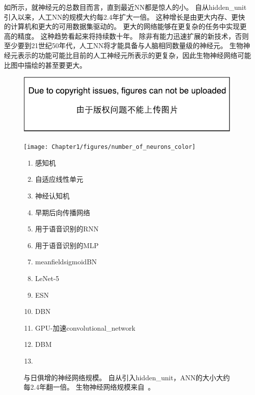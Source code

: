 如所示，就神经元的总数目而言，直到最近\gls{NN}都是惊人的小。
自从\gls{hidden_unit}引入以来，人工\gls{NN}的规模大约每2.4年扩大一倍。
这种增长是由更大内存、更快的计算机和更大的可用数据集驱动的。
更大的网络能够在更复杂的任务中实现更高的精度。
这种趋势看起来将持续数十年。
除非有能力迅速扩展的新技术，否则至少要到21世纪50年代，人工\gls{NN}将才能具备与人脑相同数量级的神经元。
生物神经元表示的功能可能比目前的人工神经元所表示的更复杂，因此生物神经网络可能比图中描绘的甚至要更大。

\begin{figure}[!htb]
\ifOpenSource
\centerline{\includegraphics{figure.pdf}}
\else
\centerline{\texttt{[image: Chapter1/figures/number\_of\_neurons\_color]}}
\fi
\caption{与日俱增的神经网络规模。
自从引入\gls{hidden_unit}，\gls{ANN}的大小大约每2.4年翻一倍。
生物神经网络规模来自~\citet{number_of_neurons}。
}
\label{fig:chap1_number_of_neurons_color}
{\tiny
\begin{enumerate}
  \itemsep-.1em
  \item %
    感知机~\citep{Rosenblatt-1958,Rosenblatt62}
  \item %
    自适应线性单元~\citep{Widrow60}
  \item %
    神经认知机~\citep{Fukushima80}
  \item %
    早期后向传播网络~\citep{Rumelhart86c}
  \item %
    用于语音识别的\gls{RNN}~\citep{Robinson+Fallside91}
  \item %
    用于语音识别的\gls{MLP}~\citep{Bengio91z}
  \item %
    \gls{meanfield}sigmoid\gls{BN}~\citep{Saul+96}
  \item %
    LeNet-5~\citep{LeCun98-small}
  \item %
    \gls{ESN}~\citep{Jaeger+Haas-2004}
  \item %
    \gls{DBN}~\citep{Hinton06}
  \item %
    GPU-加速\gls{convolutional_network}~\citep{chellapilla:inria-00112631}
  \item %
    \gls{DBM}~\citep{SalHinton09}
  \item %

\end{enumerate}}
\end{figure}
